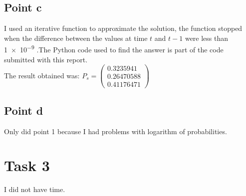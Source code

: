 \documentclass[11pt]{article}
\begin{document}
\subsection{Point c}
I used an iterative function to approximate the solution, the function stopped when the difference between the values at time $t$ and $t-1$ were less than \num{1e-9} .The Python code used to find the answer is part of the code submitted with this report. \\
The result obtained was: $P_s = \begin{pmatrix}
0.3235941 \\ 0.26470588 \\ 0.41176471
\end{pmatrix}$
\subsection{Point d}
Only did point 1 because I had problems with logarithm of probabilities.

\section{Task 3}
I did not have time.



\end{document}
